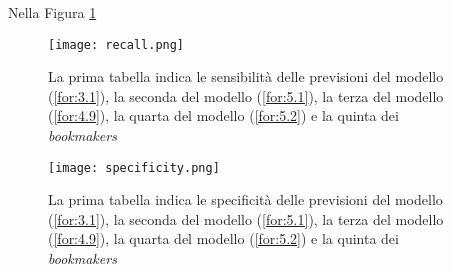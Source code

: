 Nella Figura \ref{fig:recall}

\begin{figure}[htbp]
	\begin{center}
		\texttt{[image: recall.png]}
		\caption{La prima tabella indica le sensibilità delle previsioni del modello (\ref{for:3.1}), la seconda del modello (\ref{for:5.1}), la terza del modello (\ref{for:4.9}), la quarta del modello (\ref{for:5.2}) e la quinta dei \emph{bookmakers}
			\label{fig:recall}}
	\end{center}
\end{figure}

\begin{figure}[htbp]
	\begin{center}
		\texttt{[image: specificity.png]}
		\caption{La prima tabella indica le specificità delle previsioni del modello (\ref{for:3.1}), la seconda del modello (\ref{for:5.1}), la terza del modello (\ref{for:4.9}), la quarta del modello (\ref{for:5.2}) e la quinta dei \emph{bookmakers}
			\label{fig:speci}}
	\end{center}
\end{figure}

\begin{comment}
	manca da dire la differenza di dati utilizzati per i modelli e le scommesse...
	manca da commentare i risultati dire che sopprendetemente il primo e meglio del 2 e quasi del 4 mentre il 3 è meglio di tutti. Tutti i modelli sono meglio delle bet.
\end{comment}